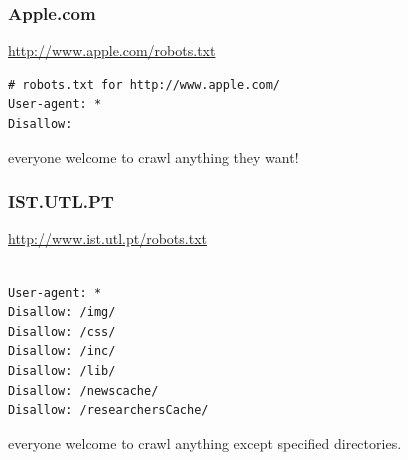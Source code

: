 \documentclass{beamer}
\begin{document}
\begin{frame}[fragile] \frametitle{Apple.com}

\begin{block}{\url{http://www.apple.com/robots.txt}}
\end{block}

\begin{verbatim}
# robots.txt for http://www.apple.com/
User-agent: *
Disallow: 
\end{verbatim}

everyone welcome to crawl anything they want!

\end{frame}

\begin{frame}[fragile] \frametitle{IST.UTL.PT}

\begin{block}{\url{http://www.ist.utl.pt/robots.txt}}
\end{block}

\begin{verbatim}

User-agent: *
Disallow: /img/
Disallow: /css/
Disallow: /inc/
Disallow: /lib/
Disallow: /newscache/
Disallow: /researchersCache/
\end{verbatim}

everyone welcome to crawl anything except specified directories.

\end{frame}














\end{document}
